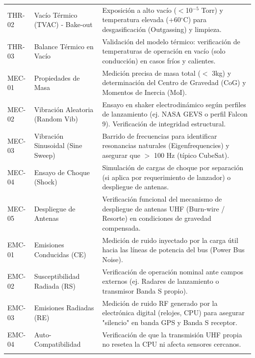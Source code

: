 \begin{footnotesize}
\begin{longtable}{@{}l >{\raggedright\arraybackslash}p{4.0cm} >{\raggedright\arraybackslash}p{8.6cm}@{}}
\addlinespace[2pt]
THR-02 & Vacío Térmico (TVAC) - Bake-out & Exposición a alto vacío ($<$10$^{-5}$ Torr) y temperatura elevada (+60$^{\circ}$C) para desgasificación (Outgassing) y limpieza. \\
\addlinespace[2pt]
THR-03 & Balance Térmico en Vacío & Validación del modelo térmico: verificación de temperaturas de operación en vacío (solo conducción) en casos fríos y calientes. \\
\addlinespace[2pt]
MEC-01 & Propiedades de Masa & Medición precisa de masa total ($<$ 3kg) y determinación del Centro de Gravedad (CoG) y Momentos de Inercia (MoI). \\
\addlinespace[2pt]
MEC-02 & Vibración Aleatoria (Random Vib) & Ensayo en shaker electrodinámico según perfiles de lanzamiento (ej. NASA GEVS o perfil Falcon 9). Verificación de integridad estructural. \\
\addlinespace[2pt]
MEC-03 & Vibración Sinusoidal (Sine Sweep) & Barrido de frecuencias para identificar resonancias naturales (Eigenfrequencies) y asegurar que $>$ 100 Hz (típico CubeSat). \\
\addlinespace[2pt]
MEC-04 & Ensayo de Choque (Shock) & Simulación de cargas de choque por separación (si aplica por requerimiento de lanzador) o despliegue de antenas. \\
\addlinespace[2pt]
MEC-05 & Despliegue de Antenas & Verificación funcional del mecanismo de despliegue de antenas UHF (Burn-wire / Resorte) en condiciones de gravedad compensada. \\
\addlinespace[2pt]
EMC-01 & Emisiones Conducidas (CE) & Medición de ruido inyectado por la carga útil hacia las líneas de potencia del bus (Power Bus Noise). \\
\addlinespace[2pt]
EMC-02 & Susceptibilidad Radiada (RS) & Verificación de operación nominal ante campos externos (ej. Radares de lanzamiento o transmisor Banda S propio). \\
\addlinespace[2pt]
EMC-03 & Emisiones Radiadas (RE) & Medición de ruido RF generado por la electrónica digital (relojes, CPU) para asegurar "silencio" en banda GPS y Banda S receptor. \\
\addlinespace[2pt]
EMC-04 & Auto-Compatibilidad & Verificación de que la transmisión UHF propia no resetea la CPU ni afecta sensores cercanos. \\
\addlinespace[2pt]
\end{longtable}
\end{footnotesize}
